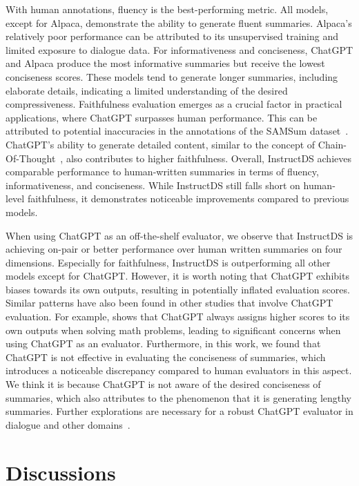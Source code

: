 \documentclass[11pt]{article}
\begin{document}
        
        With human annotations, fluency is the best-performing metric. All models, except for Alpaca, demonstrate the ability to generate fluent summaries. Alpaca's relatively poor performance can be attributed to its unsupervised training and limited exposure to dialogue data. For informativeness and conciseness, ChatGPT and Alpaca produce the most informative summaries but receive the lowest conciseness scores. These models tend to generate longer summaries, including elaborate details, indicating a limited understanding of the desired compressiveness. Faithfulness evaluation emerges as a crucial factor in practical applications, where ChatGPT surpasses human performance. This can be attributed to potential inaccuracies in the annotations of the SAMSum dataset~\cite{wang-etal-2022-analyzing,gao2023reference}. ChatGPT's ability to generate detailed content, similar to the concept of Chain-Of-Thought~\cite{wei2022chain}, also contributes to higher faithfulness. Overall, InstructDS achieves comparable performance to human-written summaries in terms of fluency, informativeness, and conciseness. While InstructDS still falls short on human-level faithfulness, it demonstrates noticeable improvements compared to previous models.
        
        
        When using ChatGPT as an off-the-shelf evaluator, we observe that InstructDS is achieving on-pair or better performance over human written summaries on four dimensions. Especially for faithfulness, InstructDS is outperforming all other models except for ChatGPT. However, it is worth noting that ChatGPT exhibits biases towards its own outputs, resulting in potentially inflated evaluation scores. Similar patterns have also been found in other studies that involve ChatGPT evaluation. For example, \citet{zhang2023exploring} shows that ChatGPT always assigns higher scores to its own outputs when solving math problems, leading to significant concerns when using ChatGPT as an evaluator. Furthermore, in this work, we found that ChatGPT is not effective in evaluating the conciseness of summaries, which introduces a noticeable discrepancy compared to human evaluators in this aspect. We think it is because ChatGPT is not aware of the desired conciseness of summaries, which also attributes to the phenomenon that it is generating lengthy summaries. Further explorations are necessary for a robust ChatGPT evaluator in dialogue and other domains~\cite{wang2023large}.

        
\section{Discussions}
\end{document}
